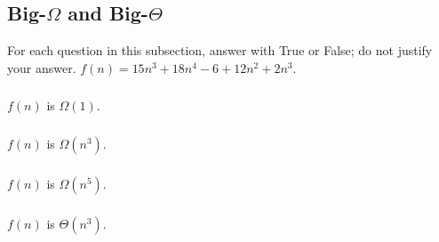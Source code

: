 \documentclass{article}
\begin{document}
\begin{mdframed}
\vspace{3em}
\end{mdframed}

\subsection{Big-$\Omega$ and Big-$\Theta$}

For each question in this subsection, answer with True or False; do not justify your answer. $f(n) = 15n^3 + 18n^4 - 6 + 12n^2 + 2n^3$.

\subsubsection{}

$f(n)$ is $\Omega(1)$.

\begin{mdframed}
\vspace{3em}
\end{mdframed}

\subsubsection{}

$f(n)$ is $\Omega(n^3)$.

\begin{mdframed}
\vspace{3em}
\end{mdframed}

\subsubsection{}

$f(n)$ is $\Omega(n^5)$.

\begin{mdframed}
\vspace{3em}
\end{mdframed}

\subsubsection{}

$f(n)$ is $\Theta(n^3)$.

\begin{mdframed}
\vspace{3em}
\end{mdframed}
\end{document}
